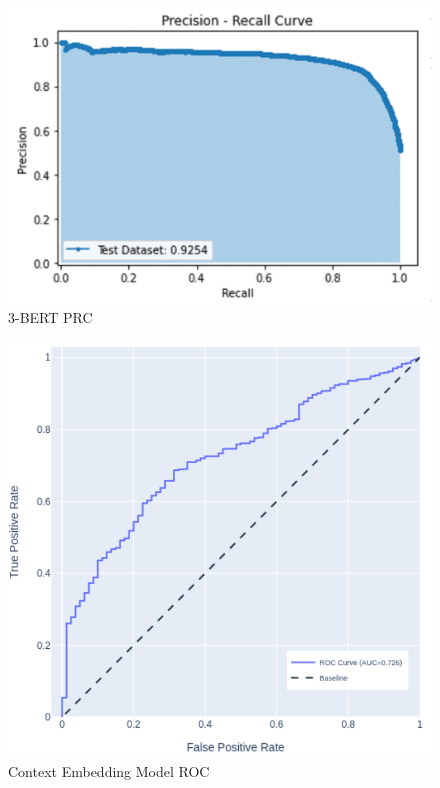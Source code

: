 \documentclass[utf8x]{ctexart}
\begin{document}
\begin{figure}[htb]
  \centering
  \includegraphics[width=\linewidth]{./3bertprc.png}
  \caption{3-BERT PRC}
  \label{fig:3bertprc}
\end{figure}

\begin{figure}[htb]
  \centering
  \includegraphics[width=\linewidth]{./cemroc.png}
  \caption{Context Embedding Model ROC}
  \label{fig:cemroc}
\end{figure}
\end{document}
